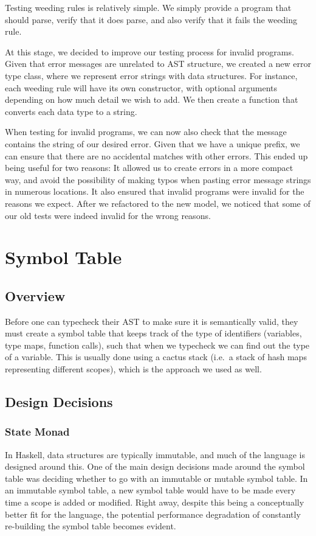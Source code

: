\documentclass[11pt]{article}
\begin{document}
Testing weeding rules is relatively simple.  We simply provide a
program that should parse, verify that it does parse, and also verify
that it fails the weeding rule.

At this stage, we decided to improve our testing process for invalid
programs.  Given that error messages are unrelated to AST structure,
we created a new error type class, where we represent error strings
with data structures.  For instance, each weeding rule will have its
own constructor, with optional arguments depending on how much detail
we wish to add.  We then create a function that converts each data
type to a string.

When testing for invalid programs, we can now also check that the
message contains the string of our desired error.  Given that we have
a unique prefix, we can ensure that there are no accidental matches
with other errors.  This ended up being useful for two reasons: It
allowed us to create errors in a more compact way, and avoid the
possibility of making typos when pasting error message strings in
numerous locations.  It also ensured that invalid programs were
invalid for the reasons we expect.  After we refactored to the new
model, we noticed that some of our old tests were indeed invalid for
the wrong reasons.

\section{Symbol Table}
\subsection{Overview}
Before one can typecheck their AST to make sure it is semantically
valid, they must create a symbol table that keeps track of the type of
identifiers (variables, type maps, function calls), such that when we
typecheck we can find out the type of a variable. This is usually done
using a cactus stack (i.e.\ a stack of hash maps representing
different scopes), which is the approach we used as well.
\subsection{Design Decisions}

\subsubsection{State Monad}
In Haskell, data structures are typically immutable, and much of the
language is designed around this. One of the main design decisions
made around the symbol table was deciding whether to go with an
immutable or mutable symbol table. In an immutable symbol table, a new
symbol table would have to be made every time a scope is added or
modified. Right away, despite this being a conceptually better fit for
the language, the potential performance degradation of constantly
re-building the symbol table becomes evident.
\end{document}
